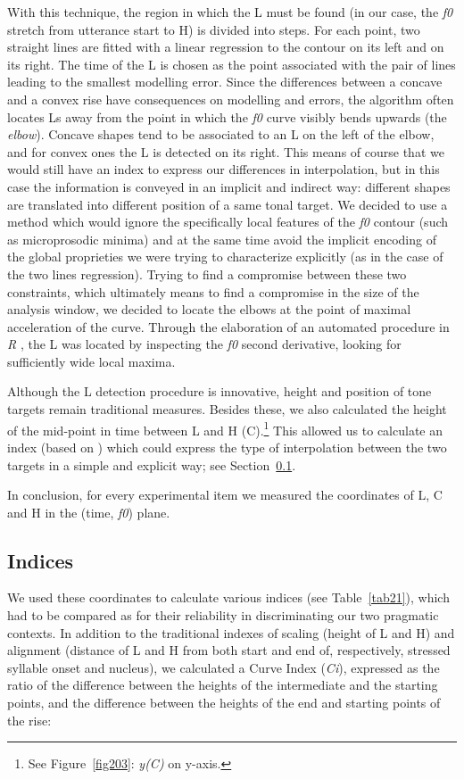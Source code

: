 With this technique, the region in which the L must be found (in our case, the \textit{f0} stretch from utterance start to H) is divided into steps. For each point, two straight lines are fitted with a linear regression to the contour on its left and on its right. The time of the L is chosen as the point associated with the pair of lines leading to the smallest modelling error. Since the differences between a concave and a convex rise have consequences on modelling and errors, the algorithm often locates Ls away from the point in which the \textit{f0} curve visibly bends upwards (the \textit{elbow}). Concave shapes tend to be associated to an L on the left of the elbow, and for convex ones the L is detected on its right. This means of course that we would still have an index to express our differences in interpolation, but in this case the information is conveyed in an implicit and indirect way: different shapes are translated into different position of a same tonal target.
We decided to use a method which would ignore the specifically local features of the \textit{f0} contour (such as microprosodic minima) and at the same time avoid the implicit encoding of the global proprieties we were trying to characterize explicitly (as in the case of the two lines regression). Trying to find a compromise between these two constraints, which ultimately means to find a compromise in the size of the analysis window, we decided to locate the elbows at the point of maximal acceleration of the curve. Through the elaboration of an automated procedure in \textit{R} \citep{r2008r}, the L was located by inspecting the \textit{f0} second derivative, looking for sufficiently wide local maxima.

Although the L detection procedure is innovative, height and position of tone targets remain traditional measures. Besides these, we also calculated the height of the mid-point in time between L and H (C).\footnote{See Figure~\ref{fig203}: \textit{y(C)} on y-axis.} This allowed us to calculate an index (based on \citealt{dombrowski2005acoustic}) which could express the type of interpolation between the two targets in a simple and explicit way; see Section~\ref{sec223}.

In conclusion, for every experimental item we measured the coordinates of L, C and H in the (time, \textit{f0}) plane.

\subsection{Indices}\label{sec223}
We used these coordinates to calculate various indices (see Table~\ref{tab21}), which had to be compared as for their reliability in discriminating our two pragmatic contexts. In addition to the traditional indexes of scaling (height of L and H) and alignment (distance of L and H from both start and end of, respectively, stressed syllable onset and nucleus), we calculated a Curve Index (\textit{Ci}), expressed as the ratio of the difference between the heights of the intermediate and the starting points, and the difference between the heights of the end and starting points of the rise:

